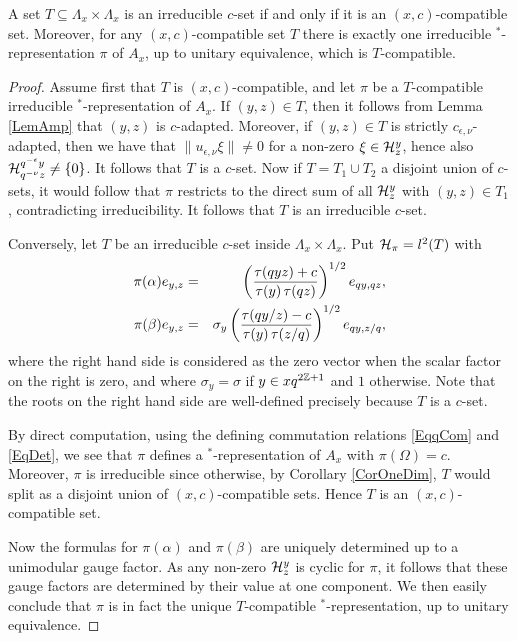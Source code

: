 \begin{Prop}\label{PropClassRep} A set $T\subseteq \Lambda_x\times \Lambda_x$ is an irreducible $c$-set if and only if it is an $(x,c)$-compatible set. Moreover, for any $(x,c)$-compatible set $T$ there is exactly one irreducible $^*$-representation $\pi$ of $A_x$, up to unitary equivalence, which is $T$-compatible.
\end{Prop}

\begin{proof} Assume first that $T$ is $(x,c)$-compatible, and let $\pi$ be a $T$-compatible irreducible $^*$-representation of $A_x$. If $(y,z)\in T$, then it follows from Lemma \ref{LemAmp} that $(y,z)$ is $c$-adapted. Moreover, if $(y,z)\in T$ is strictly $c_{\epsilon,\nu}$-adapted, then we have that $\|u_{\epsilon,\nu}\xi\|\neq 0$ for a non-zero $\xi\in \mathcal{H}^y_z$, hence also $\mathcal{H}^{q^{-\epsilon}y}_{q^{-\nu}z}\neq \{0\}$. It follows that $T$ is a $c$-set. Now if $T=T_1\cup T_2$ a disjoint union of $c$-sets, it would follow that $\pi$ restricts to the direct sum of all $\mathcal{H}^y_z$ with $(y,z)\in T_1$, contradicting irreducibility. It follows that $T$ is an irreducible $c$-set.

Conversely, let $T$ be an irreducible $c$-set inside $\Lambda_x\times \Lambda_x$. Put $\mathcal{H}_{\pi} = l^2(T)$ with \begin{eqnarray*} \pi(\alpha) e_{y,z} &=&  \left(\frac{\operatorname{\tau}(qyz)+c}{\operatorname{\tau}(y)\operatorname{\tau}(qz)}\right)^{1/2}e_{qy,qz},\\ \pi(\beta) e_{y,z} &=& \sigma_y\left(\frac{\operatorname{\tau}(qy/z)-c}{\operatorname{\tau}(y)\operatorname{\tau}(z/q)}\right)^{1/2} e_{qy,z/q},\end{eqnarray*} where the right hand side is considered as the zero vector when the scalar factor on the right is zero, and where $\sigma_y = \sigma$ if $y\in xq^{2\mathbb{Z}+1}$ and $1$ otherwise. Note that the roots on the right hand side are well-defined precisely because $T$ is a $c$-set. 

By direct computation, using the defining commutation relations \eqref{EqqCom} and \eqref{EqDet}, we see that $\pi$ defines a $^*$-representation of $A_x$ with $\pi(\Omega) =c$. Moreover, $\pi$ is irreducible since otherwise, by Corollary \ref{CorOneDim}, $T$ would split as a disjoint union of $(x,c)$-compatible sets. Hence $T$ is an $(x,c)$-compatible set.

Now the formulas for $\pi(\alpha)$ and $\pi(\beta)$ are uniquely determined up to a unimodular gauge factor. As any non-zero $\mathcal{H}^{y}_z$ is cyclic for $\pi$, it follows that these gauge factors are determined by their value at one component. We then easily conclude that $\pi$ is in fact the unique $T$-compatible $^*$-representation, up to unitary equivalence.
\end{proof}

